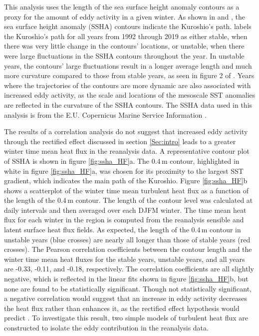 
This analysis uses the length of the sea surface height anomaly contours as a proxy for the amount of eddy activity in a given winter. As shown in \citet{qiu2005variability} and \citet{qiu2020reset}, the sea surface height anomaly (SSHA) contours indicate the Kuroshio's path. \citet{qiu2020reset} labels the Kuroshio's path for all years from 1992 through 2019 as either stable, when there was very little change in the contours' locations, or unstable, when there were large fluctuations in the SSHA contours throughout the year. In unstable years, the contours' large fluctuations result in a longer average length and much more curvature compared to those from stable years, as seen in figure 2 of \citet{qiu2020reset}. Years where the trajectories of the contours are more dynamic are also associated with increased eddy activity, as the scale and locations of the mesoscale SST anomalies are reflected in the curvature of the SSHA contours. The SSHA data used in this analysis is from the E.U. Copernicus Marine Service Information \citep{SSHA_data,SSHA_data_doc}. \par 


The results of a correlation analysis do not suggest that increased eddy activity through the rectified effect discussed in section \ref{Sec:intro} leads to a greater winter time mean heat flux in the reanalysis data. A representative contour plot of SSHA is shown in figure \ref{fig:ssha_HF}a. The 0.4\,m contour, highlighted in white in figure \ref{fig:ssha_HF}a, was chosen for its proximity to the largest SST gradient, which indicates the main path of the Kuroshio. Figure \ref{fig:ssha_HF}b shows a scatterplot of the winter time mean turbulent heat flux as a function of the length of the 0.4\,m contour. The length of the contour level was calculated at daily intervals and then averaged over each DJFM winter. The time mean heat flux for each winter in the region is computed from the reanalysis sensible and latent surface heat flux fields.  As expected, the length of the 0.4\,m contour in unstable years (blue crosses) are nearly all longer than those of stable years (red crosses). The Pearson correlation coefficients between the contour length and the winter time mean heat fluxes for the stable years, unstable years, and all years are -0.33, -0.11, and -0.18, respectively. The correlation coefficients are all slightly negative, which is reflected in the linear fits shown in figure \ref{fig:ssha_HF}b, but none are found to be statistically significant. Though not statistically significant, a negative correlation would suggest that an increase in eddy activity decreases the heat flux rather than enhances it, as the rectified effect hypothesis would predict \citep{ma2016western,ma2017revised}. To investigate this result, two simple models of turbulent heat flux are constructed to isolate the eddy contribution in the reanalysis data. 

